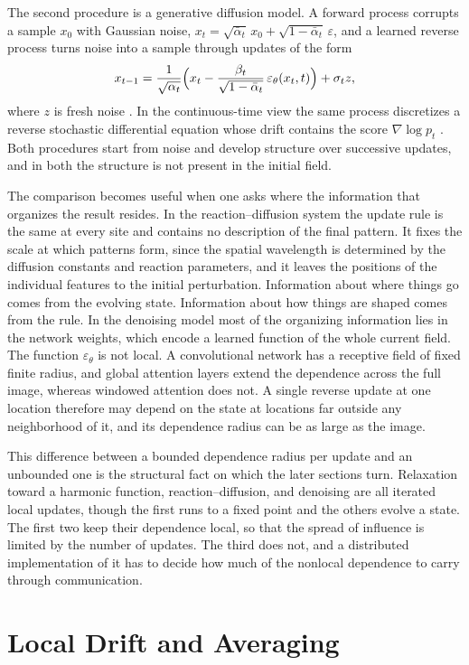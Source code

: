 \documentclass[11pt]{article}
\theoremstyle{definition}
\theoremstyle{plain}
\theoremstyle{remark}
\begin{document}
The second procedure is a generative diffusion model. A forward process corrupts a sample $x_0$ with Gaussian noise, $x_t=\sqrt{\bar\alpha_t}\,x_0+\sqrt{1-\bar\alpha_t}\,\varepsilon$, and a learned reverse process turns noise into a sample through updates of the form
\[
x_{t-1}=\frac{1}{\sqrt{\alpha_t}}\Bigl(x_t-\frac{\beta_t}{\sqrt{1-\bar\alpha_t}}\,\varepsilon_\theta(x_t,t)\Bigr)+\sigma_t z,
\]
where $z$ is fresh noise \cite{sohldickstein2015,ho2020}. In the continuous-time view the same process discretizes a reverse stochastic differential equation whose drift contains the score $\nabla\log p_t$ \cite{song2021}. Both procedures start from noise and develop structure over successive updates, and in both the structure is not present in the initial field.

The comparison becomes useful when one asks where the information that organizes the result resides. In the reaction--diffusion system the update rule is the same at every site and contains no description of the final pattern. It fixes the scale at which patterns form, since the spatial wavelength is determined by the diffusion constants and reaction parameters, and it leaves the positions of the individual features to the initial perturbation. Information about where things go comes from the evolving state. Information about how things are shaped comes from the rule. In the denoising model most of the organizing information lies in the network weights, which encode a learned function of the whole current field. The function $\varepsilon_\theta$ is not local. A convolutional network has a receptive field of fixed finite radius, and global attention layers extend the dependence across the full image, whereas windowed attention does not. A single reverse update at one location therefore may depend on the state at locations far outside any neighborhood of it, and its dependence radius can be as large as the image.

This difference between a bounded dependence radius per update and an unbounded one is the structural fact on which the later sections turn. Relaxation toward a harmonic function, reaction--diffusion, and denoising are all iterated local updates, though the first runs to a fixed point and the others evolve a state. The first two keep their dependence local, so that the spread of influence is limited by the number of updates. The third does not, and a distributed implementation of it has to decide how much of the nonlocal dependence to carry through communication.

\section{Local Drift and Averaging}\label{sec:drift}
\end{document}
